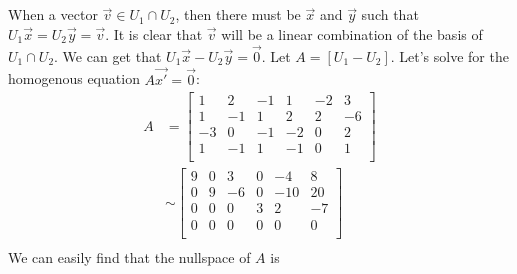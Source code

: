 \documentclass[12pt]{article}
\begin{document}
        \subsection{}
            When a vector $\vec{v} \in U_1 \cap U_2$, then there must be $\vec{x}$ and $\vec{y}$ such that $U_1\vec{x} = U_2\vec{y} = \vec{v}$. It is clear that $\vec{v}$ will be a linear combination of the basis of $U_1 \cap U_2$. 
            We can get that $U_1\vec{x} - U_2\vec{y} = \vec{0}$. Let $A = [U_1 -U_2]$. Let's solve for the homogenous equation $A\vec{x'} = \vec{0}$:
            \begin{align*}
                A &= \left[\begin{matrix}
                    1 & 2 & -1 & 1 & -2 & 3\\
                    1 & -1 & 1 & 2 & 2 & -6\\
                    -3 & 0 & -1 & -2 & 0 & 2\\
                    1 & -1 & 1 & -1 & 0 & 1\\
                \end{matrix}\right]\\
                &\sim \left[\begin{matrix}
                    9 & 0 & 3 & 0 & -4 & 8\\
                    0 & 9 & -6 & 0 & -10 & 20\\
                    0 & 0 & 0 & 3 & 2 & -7\\
                    0 & 0 & 0 & 0 & 0 & 0\\
                \end{matrix}\right]\\
            \end{align*}
            We can easily find that the nullspace of $A$ is 
\end{document}
